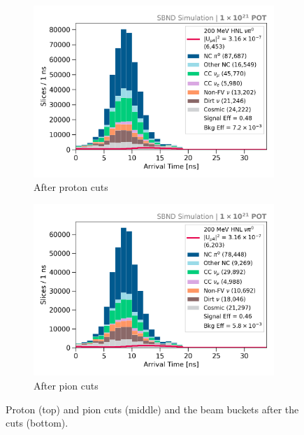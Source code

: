 \begin{figure}[ht!]
\begin{subfigure}[b]{0.495\textwidth}
            \includegraphics[width=\textwidth]{beam_bucket_postproton}
            \caption{After proton cuts}%
            \label{fig:bb_post_proton}
        \end{subfigure}
        \hfill
        \begin{subfigure}[b]{0.495\textwidth}   
            \centering 
            \includegraphics[width=\textwidth]{beam_bucket_postpion}
            \caption{After pion cuts}%
            \label{fig:bb_post_pion}
        \end{subfigure}
	\caption[Proton and Pion Cuts]{
		Proton (top) and pion cuts (middle) and the beam buckets after the cuts (bottom). 
	}
        \label{fig:razzled_proton_cut}
\end{figure}
